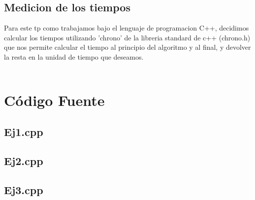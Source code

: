 \subsection{Medicion de los tiempos}

Para este tp como trabajamos bajo el lenguaje de programacion C++, decidimos calcular los tiempos utilizando 'chrono' de la libreria standard de c++ (chrono.h) que nos permite calcular el tiempo al principio del algoritmo y al final, y devolver la resta en la unidad de tiempo que deseamos.\\ \\


\section{C\'odigo Fuente}
\subsection{Ej1.cpp}


\newpage
\subsection{Ej2.cpp}


\newpage
\subsection{Ej3.cpp}



